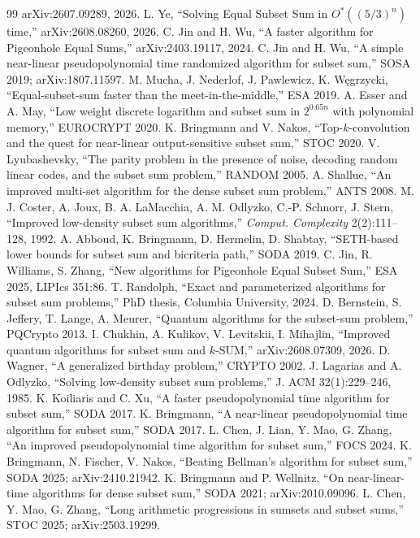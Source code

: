 \documentclass[11pt]{article}
\begin{document}
\begin{thebibliography}{99}
arXiv:2607.09289, 2026.
 L. Ye, ``Solving Equal Subset Sum in $O^*((5/3)^n)$ time,''
arXiv:2608.08260, 2026.
 C. Jin and H. Wu, ``A faster algorithm for Pigeonhole Equal Sums,''
arXiv:2403.19117, 2024.
 C. Jin and H. Wu, ``A simple near-linear pseudopolynomial time
randomized algorithm for subset sum,'' SOSA 2019; arXiv:1807.11597.
 M. Mucha, J. Nederlof, J. Pawlewicz, K. W\k{e}grzycki,
``Equal-subset-sum faster than the meet-in-the-middle,'' ESA 2019.
 A. Esser and A. May, ``Low weight discrete logarithm and subset
sum in $2^{0.65n}$ with polynomial memory,'' EUROCRYPT 2020.
 K. Bringmann and V. Nakos, ``Top-$k$-convolution and the quest for
near-linear output-sensitive subset sum,'' STOC 2020.
 V. Lyubashevsky, ``The parity problem in the presence of noise,
decoding random linear codes, and the subset sum problem,'' RANDOM 2005.
 A. Shallue, ``An improved multi-set algorithm for the dense subset
sum problem,'' ANTS 2008.
 M. J. Coster, A. Joux, B. A. LaMacchia, A. M. Odlyzko,
C.-P. Schnorr, J. Stern, ``Improved low-density subset sum algorithms,''
\emph{Comput. Complexity} 2(2):111--128, 1992.
 A. Abboud, K. Bringmann, D. Hermelin, D. Shabtay, ``SETH-based
lower bounds for subset sum and bicriteria path,'' SODA 2019.
 C. Jin, R. Williams, S. Zhang, ``New algorithms for Pigeonhole
Equal Subset Sum,'' ESA 2025, LIPIcs 351:86.
 T. Randolph, ``Exact and parameterized algorithms for subset sum
problems,'' PhD thesis, Columbia University, 2024.
 D. Bernstein, S. Jeffery, T. Lange, A. Meurer, ``Quantum
algorithms for the subset-sum problem,'' PQCrypto 2013.
 I. Chukhin, A. Kulikov, V. Levitskii, I. Mihajlin, ``Improved
quantum algorithms for subset sum and $k$-SUM,'' arXiv:2608.07309, 2026.
 D. Wagner, ``A generalized birthday problem,'' CRYPTO 2002.
 J. Lagarias and A. Odlyzko, ``Solving low-density subset sum
problems,'' J. ACM 32(1):229--246, 1985.
 K. Koiliaris and C. Xu, ``A faster pseudopolynomial time algorithm
for subset sum,'' SODA 2017.
 K. Bringmann, ``A near-linear pseudopolynomial time algorithm for
subset sum,'' SODA 2017.
 L. Chen, J. Lian, Y. Mao, G. Zhang, ``An improved pseudopolynomial
time algorithm for subset sum,'' FOCS 2024.
 K. Bringmann, N. Fischer, V. Nakos, ``Beating Bellman's algorithm
for subset sum,'' SODA 2025; arXiv:2410.21942.
 K. Bringmann and P. Wellnitz, ``On near-linear-time algorithms for
dense subset sum,'' SODA 2021; arXiv:2010.09096.
 L. Chen, Y. Mao, G. Zhang, ``Long arithmetic progressions in sumsets
and subset sums,'' STOC 2025; arXiv:2503.19299.
\end{thebibliography}
\end{document}
